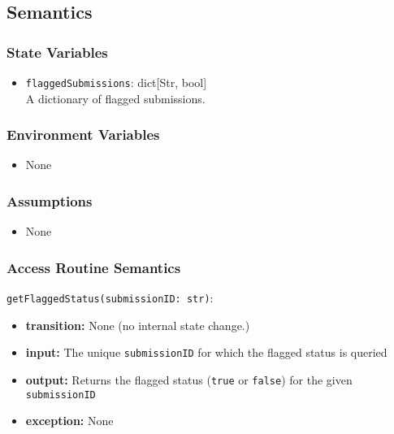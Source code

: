 \documentclass[12pt, titlepage]{article}
\begin{document}
\begin{itemize}
\subsection{Semantics}

\subsubsection{State Variables}

\begin{itemize}
    \item \texttt{flaggedSubmissions}: dict[Str, bool] \\
    A dictionary of flagged submissions.
\end{itemize}

\subsubsection{Environment Variables}

\begin{itemize}
  \item None
\end{itemize}

\subsubsection{Assumptions}

\begin{itemize}
    \item None
\end{itemize}

\subsubsection{Access Routine Semantics}

\noindent \texttt{getFlaggedStatus(submissionID: str)}:
\begin{itemize}
    \item \textbf{transition:} None (no internal state change.)
    \item \textbf{input:} The unique \texttt{submissionID} for which the flagged status is queried
    \item \textbf{output:} Returns the flagged status (\texttt{true} or \texttt{false}) for the given \texttt{submissionID}
    \item \textbf{exception:} None
\end{itemize}


\end{itemize}
\end{document}

